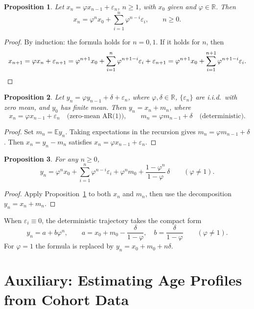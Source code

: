 \documentclass[a4paper,oneside,12pt]{extarticle}
\theoremstyle{plain}
\newtheorem{proposition}{Proposition}
\theoremstyle{definition}
\theoremstyle{remark}
\newcommand*{\ges}{\geqslant}
\newcommand*{\ve}{\varepsilon}
\newcommand*{\E}{\mathbb{E}}
\newcommand*{\vf}{\varphi}
\newcommand*{\mbR}{\mathbb{R}}
\begin{document}
\begin{proposition}
\label{prop:explicit_formula}
Let $x_n = \vf x_{n-1} + \ve_n$, $n \ges 1$, with $x_0$ given and
$\vf \in \mbR$. Then
\[
x_n = \vf^n x_0 + \sum_{i=1}^n \vf^{n-i}\ve_i, \qquad n \ges 0.
\]
\end{proposition}

\begin{proof}
By induction: the formula holds for $n=0,1$. If it holds for $n$, then
\[
x_{n+1} = \vf x_n + \ve_{n+1}
= \vf^{n+1}x_0 + \sum_{i=1}^n \vf^{n+1-i}\ve_i + \ve_{n+1}
= \vf^{n+1}x_0 + \sum_{i=1}^{n+1} \vf^{n+1-i}\ve_i. \qedhere
\]
\end{proof}

\begin{proposition}
\label{prop:decomposition}
Let $y_n = \vf y_{n-1} + \delta + \ve_n$, where $\vf,\delta\in\mbR$,
$\{\ve_n\}$ are i.i.d.\ with zero mean, and $y_0$ has finite mean.
Then $y_n = x_n + m_n$, where
\[
x_n = \vf x_{n-1} + \ve_n \quad\text{(zero-mean AR(1))}, \qquad
m_n = \vf m_{n-1} + \delta \quad\text{(deterministic)}.
\]
\end{proposition}

\begin{proof}
Set $m_n = \E y_n$. Taking expectations in the recursion gives
$m_n = \vf m_{n-1} + \delta$. Then $x_n = y_n - m_n$ satisfies
$x_n = \vf x_{n-1} + \ve_n$.
\end{proof}

\begin{proposition}
For any $n \ges 0$,
\[
y_n = \vf^n x_0 + \sum_{i=1}^n \vf^{n-i}\ve_i
      + \vf^n m_0 + \frac{1-\vf^n}{1-\vf}\,\delta
\qquad (\vf \neq 1).
\]
\end{proposition}

\begin{proof}
Apply Proposition~\ref{prop:explicit_formula} to both $x_n$ and $m_n$,
then use the decomposition $y_n = x_n + m_n$.
\end{proof}

When $\ve_i \equiv 0$, the deterministic trajectory takes the compact form
\begin{equation}
\label{eq:y_sequence_a_b_def}
y_n = a + b\vf^n, \qquad
a = x_0 + m_0 - \frac{\delta}{1-\vf}, \quad
b = \frac{\delta}{1-\vf} \qquad (\vf \neq 1).
\end{equation}
For $\vf = 1$ the formula is replaced by $y_n = x_0 + m_0 + n\delta$.


\section{Auxiliary: Estimating Age Profiles from Cohort Data}
\label{sec:curvefitting}
\end{document}
